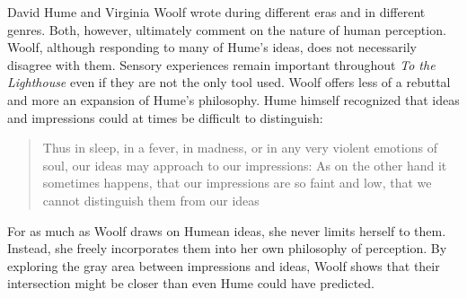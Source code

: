 David Hume and Virginia Woolf wrote during different eras and in different genres. Both, however, ultimately comment on the nature of human perception. Woolf, although responding to many of Hume's ideas, does not necessarily disagree with them. Sensory experiences remain important throughout \emph{To the Lighthouse} even if they are not the only tool used. Woolf offers less of a rebuttal and more an expansion of Hume's philosophy. Hume himself recognized that ideas and impressions could at times be difficult to distinguish:

\blockcquote[][2]{hume_78}[.]{Thus in sleep, in a fever, in madness, or in any very violent emotions of soul, our ideas may approach to our impressions: As on the other hand it sometimes happens, that our impressions are so faint and low, that we cannot distinguish them from our ideas}

For as much as Woolf draws on Humean ideas, she never limits herself to them. Instead, she freely incorporates them into her own philosophy of perception. By exploring the gray area between impressions and ideas, Woolf shows that their intersection might be closer than even Hume could have predicted.

%
%

\newpage

\printbibliography


